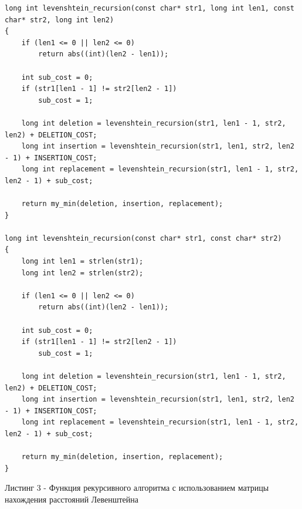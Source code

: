 \documentclass[12pt]{report}
\begin{document}
\begin{lstlisting}
long int levenshtein_recursion(const char* str1, long int len1, const char* str2, long int len2)
{
	if (len1 <= 0 || len2 <= 0)
		return abs((int)(len2 - len1));
	
	int sub_cost = 0;
	if (str1[len1 - 1] != str2[len2 - 1])
		sub_cost = 1;
	
	long int deletion = levenshtein_recursion(str1, len1 - 1, str2, len2) + DELETION_COST;
	long int insertion = levenshtein_recursion(str1, len1, str2, len2 - 1) + INSERTION_COST;
	long int replacement = levenshtein_recursion(str1, len1 - 1, str2, len2 - 1) + sub_cost;
	
	return my_min(deletion, insertion, replacement);
}

long int levenshtein_recursion(const char* str1, const char* str2)
{
	long int len1 = strlen(str1);
	long int len2 = strlen(str2);
	
	if (len1 <= 0 || len2 <= 0)
		return abs((int)(len2 - len1));
	
	int sub_cost = 0;
	if (str1[len1 - 1] != str2[len2 - 1])
		sub_cost = 1;
	
	long int deletion = levenshtein_recursion(str1, len1 - 1, str2, len2) + DELETION_COST;
	long int insertion = levenshtein_recursion(str1, len1, str2, len2 - 1) + INSERTION_COST;
	long int replacement = levenshtein_recursion(str1, len1 - 1, str2, len2 - 1) + sub_cost;
	
	return my_min(deletion, insertion, replacement);
}
\end{lstlisting}

Листинг 3 - Функция рекурсивного алгоритма с использованием матрицы нахождения расстояний Левенштейна
\end{document}
